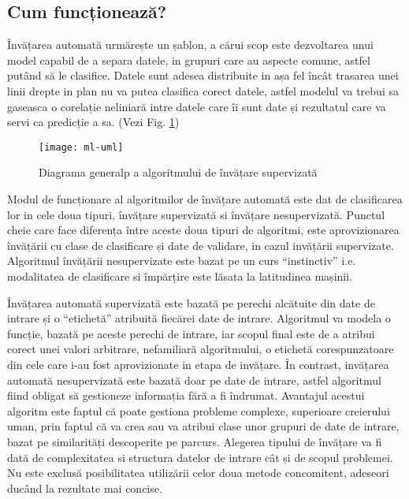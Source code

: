 	
	\subsection{Cum funcționează?}
	Învățarea automată urmărește un șablon, a cărui scop este dezvoltarea unui model capabil de a separa datele, in grupuri care au aspecte comune, astfel putând să le clasifice. Datele sunt adesea distribuite in așa fel încât trasarea unei linii drepte in plan nu va putea clasifica corect datele, astfel  modelul va trebui sa gaseasca o corelație neliniară intre datele care îi sunt date și rezultatul care va servi ca predicție a sa. (Vezi Fig. \ref{fig:uml-diagram})
	

	
	\begin{figure}[H]
		\texttt{[image: ml-uml]}  
		\caption{\label{fig:uml-diagram} Diagrama generalp a algoritmului de învățare supervizată
		\protect
		\cite{ml_intro}}
	\end{figure}


	\newpage
	
	Modul de funcționare al algoritmilor de învățare automată este dat de clasificarea lor in cele doua tipuri, învățare supervizată si învățare nesupervizată. Punctul cheie care face diferența între aceste doua tipuri de algoritmi, este aprovizionarea învățării cu clase de clasificare și date de validare, in cazul invățării supervizate. Algoritmul învățării nesupervizate este bazat pe un curs “instinctiv” i.e. modalitatea de clasificare si împărțire este lăsata la latitudinea mașinii.
	
	Învățarea automată supervizată este bazată pe perechi alcătuite din date de intrare și o “etichetă” atribuită fiecărei date de intrare. Algoritmul va modela o funcție, bazată pe aceste perechi de intrare, iar scopul final este de a atribui corect unei valori arbitrare, nefamiliară algoritmului, o etichetă corespunzatoare din cele care i-au fost aprovizionate in etapa de invățare. 
	În contrast, invățarea automată nesupervizată este bazată doar pe date de intrare, astfel algoritmul fiind obligat să gestioneze informația fără a fi îndrumat. Avantajul acestui algoritm este faptul că poate gestiona probleme complexe, superioare creierului uman, prin faptul că va crea sau va atribui clase unor grupuri de date de intrare, bazat pe similarități descoperite pe parcurs.
	Alegerea tipului de învățare va fi dată de complexitatea si structura  datelor de intrare cât și de scopul problemei. Nu este exclusă posibilitatea utilizării celor doua metode concomitent, adeseori ducând la rezultate mai concise.
	
